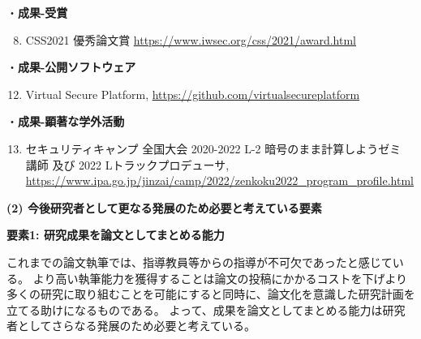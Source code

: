 ・\noindent\textbf{成果-受賞}
\begin{enumerate}[leftmargin=0.5cm]
    \setcounter{enumi}{7}
    \setlength{\parskip}{0cm} %
    \setlength{\itemsep}{0cm} %
	\label{achieve:mitou}
	\label{achieve:nhk}
	\label{achieve:vsp}
	\item CSS2021 優秀論文賞 \url{https://www.iwsec.org/css/2021/award.html} \label{achieve:css}
\end{enumerate}


・\noindent\textbf{成果-公開ソフトウェア}
\begin{enumerate}[leftmargin=0.5cm]
    \setcounter{enumi}{11}
    \setlength{\parskip}{0cm} %
    \setlength{\itemsep}{0cm} %
	\item Virtual Secure Platform, \url{https://github.com/virtualsecureplatform}\label{code:vsp}
\end{enumerate}

・\noindent\textbf{成果-顕著な学外活動}

\begin{enumerate}[leftmargin=0.5cm]
    \setcounter{enumi}{12}
	\item セキュリティキャンプ 全国大会 2020-2022 L-2 暗号のまま計算しようゼミ 講師 及び 2022 Lトラックプロデューサ, \url{https://www.ipa.go.jp/jinzai/camp/2022/zenkoku2022_program_profile.html}\label{achieve:seccamp}
\end{enumerate}

\vspace{5mm}
\noindent\textbf{(2) 今後研究者として更なる発展のため必要と考えている要素}



\noindent\textbf{要素1: 研究成果を論文としてまとめる能力}

これまでの論文執筆では、指導教員等からの指導が不可欠であったと感じている。
より高い執筆能力を獲得することは論文の投稿にかかるコストを下げより多くの研究に取り組むことを可能にすると同時に、論文化を意識した研究計画を立てる助けになるものである。
よって、成果を論文としてまとめる能力は研究者としてさらなる発展のため必要と考えている。

